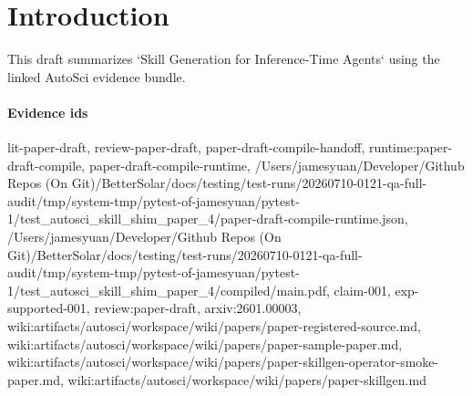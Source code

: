 \section{Introduction}
This draft summarizes `Skill Generation for Inference-Time Agents` using the linked AutoSci evidence bundle.

\paragraph{Evidence ids} lit-paper-draft, review-paper-draft, paper-draft-compile-handoff, runtime:paper-draft-compile, paper-draft-compile-runtime, /Users/jamesyuan/Developer/Github Repos (On Git)/BetterSolar/docs/testing/test-runs/20260710-0121-qa-full-audit/tmp/system-tmp/pytest-of-jamesyuan/pytest-1/test\_autosci\_skill\_shim\_paper\_4/paper-draft-compile-runtime.json, /Users/jamesyuan/Developer/Github Repos (On Git)/BetterSolar/docs/testing/test-runs/20260710-0121-qa-full-audit/tmp/system-tmp/pytest-of-jamesyuan/pytest-1/test\_autosci\_skill\_shim\_paper\_4/compiled/main.pdf, claim-001, exp-supported-001, review:paper-draft, arxiv:2601.00003, wiki:artifacts/autosci/workspace/wiki/papers/paper-registered-source.md, wiki:artifacts/autosci/workspace/wiki/papers/paper-sample-paper.md, wiki:artifacts/autosci/workspace/wiki/papers/paper-skillgen-operator-smoke-paper.md, wiki:artifacts/autosci/workspace/wiki/papers/paper-skillgen.md
